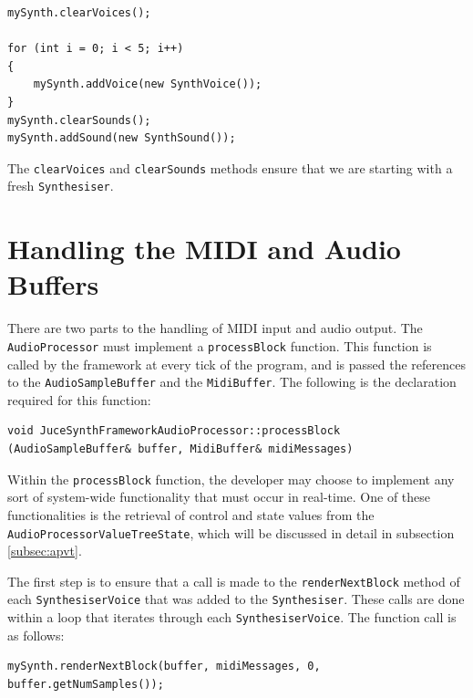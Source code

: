 \documentclass[a4paper,12pt]{report}
\begin{document}
 \noindent\begin{minipage}{\linewidth} \begin{lstlisting}[caption={Instantiating Voices},label={code:instantiatingvoices},captionpos=b]
mySynth.clearVoices();
    
for (int i = 0; i < 5; i++)
{
    mySynth.addVoice(new SynthVoice());
}
mySynth.clearSounds();
mySynth.addSound(new SynthSound());
\end{lstlisting}
\end{minipage}

The \texttt{clear\-Voices} and \texttt{clear\-Sounds} methods ensure that we are starting with a fresh \texttt{Synthesiser}.

\section{Handling the MIDI and Audio Buffers}
\label{sec:handlingbuffers}
There are two parts to the handling of MIDI input and audio output. The \texttt{Audio\-Processor} must implement a \texttt{process\-Block} function. This function is called by the framework at every tick of the program, and is passed the references to the \texttt{Audio\-Sample\-Buffer} and the \texttt{Midi\-Buffer}. The following is the declaration required for this function:

 \noindent\begin{minipage}{\linewidth} \begin{lstlisting}[caption={processBlock Declaration},label={code:processblockdeclaration},captionpos=b]
void JuceSynthFrameworkAudioProcessor::processBlock (AudioSampleBuffer& buffer, MidiBuffer& midiMessages)
\end{lstlisting} \end{minipage}

Within the \texttt{process\-Block} function, the developer may choose to implement any sort of system-wide functionality that must occur in real-time. One of these functionalities is the retrieval of control and state values from the \texttt{Audio\-Processor\-Value\-Tree\-State}, which will be discussed in detail in subsection \ref{subsec:apvt}.

The first step is to ensure that a call is made to the \texttt{render\-Next\-Block} method of each \texttt{Synthesiser\-Voice} that was added to the \texttt{Synthesiser}. These calls are done within a loop that iterates through each \texttt{Synthesiser\-Voice}. The function call is as follows: 

 \noindent\begin{minipage}{\linewidth} \begin{lstlisting}[caption={renderNextBlock Function Call},label={code:rendernextblockfunccall},captionpos=b]
mySynth.renderNextBlock(buffer, midiMessages, 0, buffer.getNumSamples());
\end{lstlisting} \end{minipage}
\end{document}
